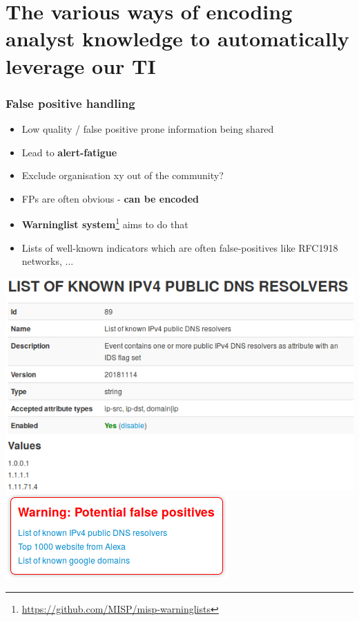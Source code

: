 \section{The various ways of encoding analyst knowledge to automatically leverage our TI}

\begin{frame}
\frametitle{False positive handling}
\begin{itemize}
        \item Low quality / false positive prone information being shared
        \item Lead to {\bf alert-fatigue}
        \item Exclude organisation xy out of the community?
        \item FPs are often obvious - {\bf can be encoded}
        \item {\bf Warninglist system}\footnote{\url{https://github.com/MISP/misp-warninglists}} aims to do that
        \item Lists of well-known indicators which are often false-positives like RFC1918 networks, ...
\end{itemize}
\begin{center}
    \includegraphics[scale=0.22]{warning-list.png}
    \includegraphics[scale=0.45]{warning-list-event.png}
\end{center}
\end{frame}

